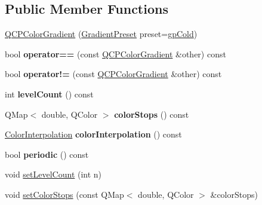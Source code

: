 \subsection*{Public Member Functions}
\begin{DoxyCompactItemize}
\item 
\hyperlink{class_q_c_p_color_gradient_a546e44df5fa1846400a582c041361c85}{Q\+C\+P\+Color\+Gradient} (\hyperlink{class_q_c_p_color_gradient_aed6569828fee337023670272910c9072}{Gradient\+Preset} preset=\hyperlink{class_q_c_p_color_gradient_aed6569828fee337023670272910c9072aec8c001f62c0d5cb853db5fd85309557}{gp\+Cold})
\item 
\mbox{\label{class_q_c_p_color_gradient_a7f3478c33c59aa3c03b9ea1f809877fa}} 
bool {\bfseries operator==} (const \hyperlink{class_q_c_p_color_gradient}{Q\+C\+P\+Color\+Gradient} \&other) const
\item 
\mbox{\label{class_q_c_p_color_gradient_ad26a10e3beaef4fc6f2553d1a9756087}} 
bool {\bfseries operator!=} (const \hyperlink{class_q_c_p_color_gradient}{Q\+C\+P\+Color\+Gradient} \&other) const
\item 
\mbox{\label{class_q_c_p_color_gradient_ac4b9d7034fc3b6c76318b05075367090}} 
int {\bfseries level\+Count} () const
\item 
\mbox{\label{class_q_c_p_color_gradient_aaab19729e921682401044ac8e518ff02}} 
Q\+Map$<$ double, Q\+Color $>$ {\bfseries color\+Stops} () const
\item 
\mbox{\label{class_q_c_p_color_gradient_abad5002858db8cf75ecb045200881de6}} 
\hyperlink{class_q_c_p_color_gradient_ac5dca17cc24336e6ca176610e7f77fc1}{Color\+Interpolation} {\bfseries color\+Interpolation} () const
\item 
\mbox{\label{class_q_c_p_color_gradient_a22a1d2b17f203caf0dcec833507fb9e0}} 
bool {\bfseries periodic} () const
\item 
void \hyperlink{class_q_c_p_color_gradient_a18da587eb4f7fc788ea28ba15b6a12de}{set\+Level\+Count} (int n)
\item 
void \hyperlink{class_q_c_p_color_gradient_a724e828aa6f0ba5011a9392477c35d3a}{set\+Color\+Stops} (const Q\+Map$<$ double, Q\+Color $>$ \&color\+Stops)

\end{DoxyCompactItemize}
